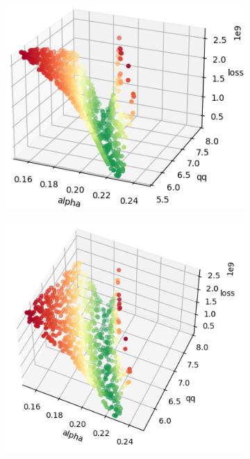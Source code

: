 \begin{figure}[h]
\begin{subfigure}[b]{0.4\textwidth}
	\end{subfigure}
	\begin{subfigure}[b]{0.4\textwidth}
		\centering
		\includegraphics[width=\textwidth]{./figures/sensitivity/sensitivity_zoom2_0_2.png}	
	\end{subfigure}
	\begin{subfigure}[b]{0.4\textwidth}
		\centering
		\includegraphics[width=\textwidth]{./figures/sensitivity/sensitivity_zoom2_1_2.png}	

\end{subfigure}
\end{figure}
